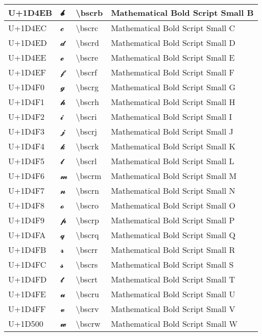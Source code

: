 \begin{table}[h]
\begin{tabulary}{\linewidth}{|L|L|L|L|}
\hline
U+1D4EB & 𝓫 & {\textbackslash}bscrb & Mathematical Bold Script Small B \\
\hline
U+1D4EC & 𝓬 & {\textbackslash}bscrc & Mathematical Bold Script Small C \\
\hline
U+1D4ED & 𝓭 & {\textbackslash}bscrd & Mathematical Bold Script Small D \\
\hline
U+1D4EE & 𝓮 & {\textbackslash}bscre & Mathematical Bold Script Small E \\
\hline
U+1D4EF & 𝓯 & {\textbackslash}bscrf & Mathematical Bold Script Small F \\
\hline
U+1D4F0 & 𝓰 & {\textbackslash}bscrg & Mathematical Bold Script Small G \\
\hline
U+1D4F1 & 𝓱 & {\textbackslash}bscrh & Mathematical Bold Script Small H \\
\hline
U+1D4F2 & 𝓲 & {\textbackslash}bscri & Mathematical Bold Script Small I \\
\hline
U+1D4F3 & 𝓳 & {\textbackslash}bscrj & Mathematical Bold Script Small J \\
\hline
U+1D4F4 & 𝓴 & {\textbackslash}bscrk & Mathematical Bold Script Small K \\
\hline
U+1D4F5 & 𝓵 & {\textbackslash}bscrl & Mathematical Bold Script Small L \\
\hline
U+1D4F6 & 𝓶 & {\textbackslash}bscrm & Mathematical Bold Script Small M \\
\hline
U+1D4F7 & 𝓷 & {\textbackslash}bscrn & Mathematical Bold Script Small N \\
\hline
U+1D4F8 & 𝓸 & {\textbackslash}bscro & Mathematical Bold Script Small O \\
\hline
U+1D4F9 & 𝓹 & {\textbackslash}bscrp & Mathematical Bold Script Small P \\
\hline
U+1D4FA & 𝓺 & {\textbackslash}bscrq & Mathematical Bold Script Small Q \\
\hline
U+1D4FB & 𝓻 & {\textbackslash}bscrr & Mathematical Bold Script Small R \\
\hline
U+1D4FC & 𝓼 & {\textbackslash}bscrs & Mathematical Bold Script Small S \\
\hline
U+1D4FD & 𝓽 & {\textbackslash}bscrt & Mathematical Bold Script Small T \\
\hline
U+1D4FE & 𝓾 & {\textbackslash}bscru & Mathematical Bold Script Small U \\
\hline
U+1D4FF & 𝓿 & {\textbackslash}bscrv & Mathematical Bold Script Small V \\
\hline
U+1D500 & 𝔀 & {\textbackslash}bscrw & Mathematical Bold Script Small W \\

\end{tabulary}
\end{table}
